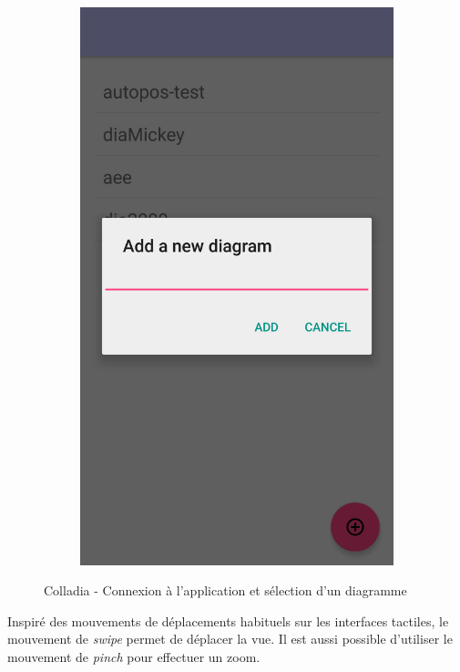 \begin{figure}[!h]
\begin{subfigure}[t]{.3\textwidth}
				\includegraphics[width=\textwidth]{img/screen/colladia_create_workspace}
			\end{subfigure}
			\caption{Colladia - Connexion à l'application et sélection d'un diagramme}
		\end{figure}
		\vspace*{\fill}
		
Inspiré des mouvements de déplacements habituels sur les interfaces tactiles, le mouvement de \textit{swipe} permet de déplacer la vue. Il est aussi possible d'utiliser le mouvement de \textit{pinch} pour effectuer un zoom.

